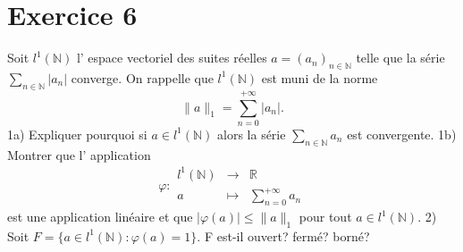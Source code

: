 \documentclass{article}
\begin{document}
\section{Exercice 6}
Soit $l^1(\mathbb{N})$ l' espace vectoriel des suites réelles $a = (a_n)_{n\in\mathbb{N}}$ telle que la série $\sum_{n\in\mathbb{N}} |a_n|$ converge. On rappelle que $l^1(\mathbb{N})$ est muni de la norme
\[ \|a\|_1 = \sum_{n=0}^{+\infty} |a_n|. \]
1a) Expliquer pourquoi si $a \in l^1(\mathbb{N})$ alors la série $\sum_{n\in\mathbb{N}} a_n$ est convergente.
1b) Montrer que l' application
\[ \varphi: \begin{array}{ccc} l^1(\mathbb{N}) & \to & \mathbb{R} \\ a & \mapsto & \sum_{n=0}^{+\infty} a_n \end{array} \]
est une application linéaire et que $|\varphi(a)| \le \|a\|_1$ pour tout $a \in l^1(\mathbb{N})$.
2) Soit $F = \{a \in l^1(\mathbb{N}) : \varphi(a) = 1\}$. F est-il ouvert? fermé? borné?
\end{document}
